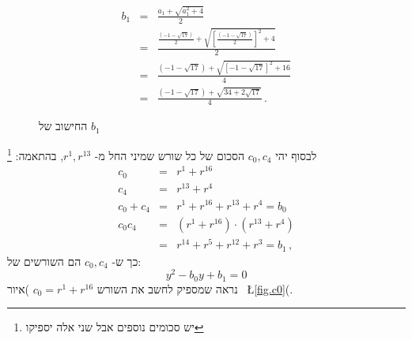 \documentclass[11pt,a4paper]{article}
\newenvironment{form}[1]{%
\begin{displaymath}%
\renewcommand{\arraystretch}{#1}%
\begin{array}{lcl}}%
{\end{array}%
\end{displaymath}%
}
\newcommand*{\disfrac}[2]{\displaystyle\frac{#1}{#2}}
\begin{document}
\begin{figure}
\begin{form}{2.8}
b_1&=&\disfrac{a_1+\sqrt{a_1^2+4}}{2}\\
&=&\disfrac{
     \disfrac{(-1-\sqrt{17})}{2} + 
     \sqrt{\left[\disfrac{(-1-\sqrt{17})}{2}\right]^2+4}
   }{2}\\
&=&\disfrac{
     (-1-\sqrt{17}) + 
     \sqrt{\left[-1-\sqrt{17}\right]^2+16}
   }{4}\\
&=&\disfrac{
     (-1-\sqrt{17}) + 
     \sqrt{34+2\sqrt{17}}
   }{4}\,.
\end{form}\vspace{-2em}
\caption{החישוב של $b_1$}\label{fig.b1}
\end{figure}
לבסוף יהי
$c_0,c_4$ 
הסכום של כל שורש שמיני החל מ-%
$r^1,r^{13}$,
בהתאמה:%
\footnote{יש סכומים נוספים אבל שני אלה יספיקו}
\begin{form}{1.4}
c_0&=&r^1+r^{16}\\
c_4&=&r^{13}+r^4\\
c_0+c_4&=&r^1+r^{16}+r^{13}+r^4=b_0\\
c_0c_4&=&(r^1+r^{16})\cdot(r^{13}+r^4)\\
&=&r^{14}+r^5+r^{12}+r^3=b_1\,,
\end{form}
כך ש-%
$c_0,c_4$
הם השורשים של:
\[
y^2-b_0y+b_1=0
\]
נראה שמספיק לחשב את השורש
$c_0=r^1+r^{16}$
)איור~
\L{\ref{fig.c0}}(.
\end{document}
